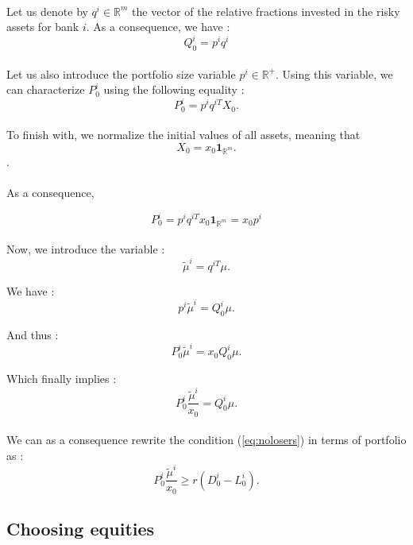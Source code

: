 \documentclass{article}
\begin{document}
\begin{appendices}
\paragraph{}
Let us denote by $q^i \in \mathbb{R}^m$ the vector of the relative fractions invested in the risky assets for bank $i$. As a consequence, we have : 
$$Q_0^i = p^i q^i $$

\paragraph{}
Let us also introduce the portfolio size variable $p^i \in \mathbb{R}^+$. Using this variable, we can characterize $P_0^i$ using the following equality :  
$$P_0^i = p^i q^{iT} X_0.$$

\paragraph{}
To finish with, we normalize the initial values of all assets, meaning that 
$$X_0 = x_0 \mathbf{1}_{\mathbb{R}^m}.$$. 

\paragraph{}
As a consequence,

$$P_0^i = p^i q^{iT} x_0 \mathbf{1}_{\mathbb{R}^m} = x_0 p^i$$

\paragraph{}
Now, we introduce the variable : 
$$ \tilde{\mu}^i = q^{iT} \mu.$$

We have : 
$$ p^i \tilde{\mu}^i = Q_0^{i} \mu.$$

And thus : 
$$ P_0^i \tilde{\mu}^i = x_0 Q_0^{i} \mu.$$

Which finally implies : 
$$ P_0^i \frac{\tilde{\mu}^i}{x_0} = Q_0^{i} \mu.$$

\paragraph{}
We can as a consequence rewrite the condition (\ref{eq:nolosers}) in terms of portfolio as :
$$P_0^i \frac{\tilde{\mu}^i}{x_0} \geq r(D_0^i - L_0^i).$$

\subsection{Choosing equities}


\end{appendices}
\end{document}

